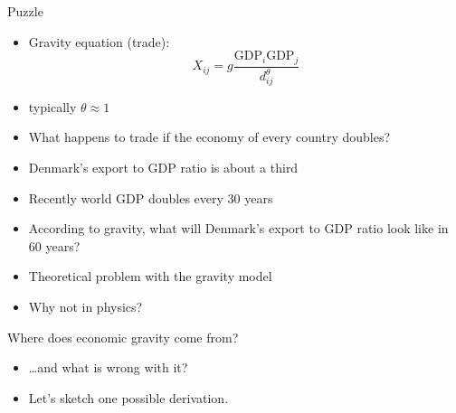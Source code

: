 \documentclass[ignorenonframetext,]{beamer}
\begin{document}
\begin{frame}{Puzzle}
    
    \begin{itemize}
        \item Gravity equation (trade):
        \begin{equation*}
            X_{ij} = g \frac{\mbox{GDP}_i \mbox{GDP}_j}{d_{ij}^\theta}
        \end{equation*}
        \item typically $\theta \approx 1$
    \end{itemize}

    \begin{itemize}
        \item What happens to trade if the economy of every country doubles?
    \end{itemize}

\end{frame}

\begin{frame}

    \begin{itemize}
        \item Denmark's export to GDP ratio is about a third
        \item Recently world GDP doubles every 30 years
        \item According to gravity, what will Denmark's export to GDP ratio look like in 60 years? 
    \end{itemize}
    \begin{itemize}
        \item Theoretical problem with the gravity model
        \item Why not in physics? 
    \end{itemize}

\end{frame}

\begin{frame}{Where does economic gravity come from?}

    \begin{itemize}
        \item \dots and what is wrong with it? 
        \item Let's sketch one possible derivation.
    \end{itemize}

\end{frame}
\end{document}
